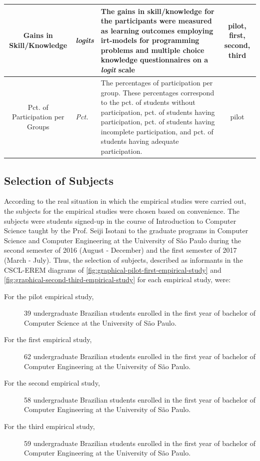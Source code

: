 {\begin{longtable}{cllc}
\multicolumn{1}{p{2cm}}{\centering \mbox{Gains} in \mbox{Skill}/\mbox{Knowledge}} &
\multicolumn{1}{p{2.5cm}}{\centering \emph{logits}} &
\multicolumn{1}{p{8.5cm}}{The gains in skill/knowledge for the participants were measured as learning outcomes employing irt-models for programming problems and multiple choice knowledge questionnaires on a \emph{logit} scale} &
\multicolumn{1}{p{1.5cm}}{\centering pilot, first, second, third}
\tabularnewline \hline


\multicolumn{1}{p{2cm}}{\centering Pct. of \mbox{Participation} per \mbox{Groups}} &
\multicolumn{1}{p{2.5cm}}{\centering \mbox{\emph{Pct.}}} &
\multicolumn{1}{p{8.5cm}}{The percentages of participation per group. These percentages correspond to the 
pct. of students without participation, pct. of students having participation, pct. of students having incomplete participation, and pct. of students having adequate participation.} &
\multicolumn{1}{p{1.5cm}}{\centering pilot}
\tabularnewline \hline

\end{longtable}}


\subsection{Selection of Subjects}

According to the real situation in which the empirical studies were carried out, the subjects for the empirical studies were chosen based on convenience. 
The subjects were students signed-up in the course of Introduction to Computer Science taught by the Prof. Seiji Isotani to the graduate programs in Computer Science and Computer Engineering at the University of São Paulo during the second semester of 2016 (August -  December) and the first semester of 2017 (March - July).
Thus, the selection of subjects, described as informants in the CSCL-EREM diagrams of \autoref{fig:graphical-pilot-first-empirical-study} and \autoref{fig:graphical-second-third-empirical-study} for each empirical study, were: 

\begin{description}
\item[For the pilot empirical study,]
39 undergraduate Brazilian students enrolled in the first year of bachelor of Computer Science at the University of São Paulo.
\item[For the first empirical study,]
62 undergraduate Brazilian students enrolled in the first year of bachelor of Computer Engineering at the University of São Paulo.
\item[For the second empirical study,]
58 undergraduate Brazilian students enrolled in the first year of bachelor of Computer Engineering at the University of São Paulo.
\item[For the third empirical study,]
59 undergraduate Brazilian students enrolled in the first year of bachelor of Computer Engineering at the University of São Paulo.
\end{description}

